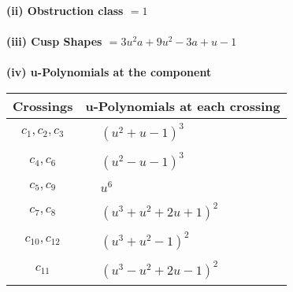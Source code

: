 \documentclass[1p]{elsarticle_modified}
\theoremstyle{definition}
\begin{document}
\flushleft \textbf{(ii) Obstruction class $= 1$}\\~\\
\flushleft \textbf{(iii) Cusp Shapes $= 3 u^2 a+9 u^2-3 a+u-1$}\\~\\
\newpage\renewcommand{\arraystretch}{1}
\flushleft \textbf{(iv) u-Polynomials at the component}\newline \\
\begin{tabular}{m{50pt}|m{274pt}}
Crossings & \hspace{64pt}u-Polynomials at each crossing \\
\hline $$\begin{aligned}c_{1},c_{2},c_{3}\end{aligned}$$&$\begin{aligned}
&(u^2+u-1)^3
\end{aligned}$\\
\hline $$\begin{aligned}c_{4},c_{6}\end{aligned}$$&$\begin{aligned}
&(u^2- u-1)^3
\end{aligned}$\\
\hline $$\begin{aligned}c_{5},c_{9}\end{aligned}$$&$\begin{aligned}
&u^6
\end{aligned}$\\
\hline $$\begin{aligned}c_{7},c_{8}\end{aligned}$$&$\begin{aligned}
&(u^3+u^2+2 u+1)^2
\end{aligned}$\\
\hline $$\begin{aligned}c_{10},c_{12}\end{aligned}$$&$\begin{aligned}
&(u^3+u^2-1)^2
\end{aligned}$\\
\hline $$\begin{aligned}c_{11}\end{aligned}$$&$\begin{aligned}
&(u^3- u^2+2 u-1)^2
\end{aligned}$\\
\hline
\end{tabular}\\~\\
\end{document}
